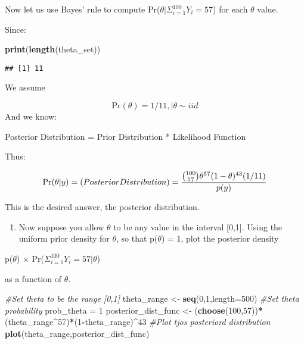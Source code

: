 \documentclass[]{article}
\newenvironment{Shaded}{\begin{snugshade}}{\end{snugshade}}
\newcommand{\KeywordTok}[1]{\textcolor[rgb]{0.13,0.29,0.53}{\textbf{#1}}}
\newcommand{\DataTypeTok}[1]{\textcolor[rgb]{0.13,0.29,0.53}{#1}}
\newcommand{\DecValTok}[1]{\textcolor[rgb]{0.00,0.00,0.81}{#1}}
\newcommand{\StringTok}[1]{\textcolor[rgb]{0.31,0.60,0.02}{#1}}
\newcommand{\CommentTok}[1]{\textcolor[rgb]{0.56,0.35,0.01}{\textit{#1}}}
\newcommand{\OperatorTok}[1]{\textcolor[rgb]{0.81,0.36,0.00}{\textbf{#1}}}
\newcommand{\NormalTok}[1]{#1}
\providecommand{\tightlist}{%
  \setlength{\itemsep}{0pt}\setlength{\parskip}{0pt}}
\begin{document}
Now let us use Bayes' rule to compute
Pr(\(\theta | \Sigma_{i=1}^{100} Y_i = 57\)) for each \(\theta\) value.

Since:

\begin{Shaded}
\begin{Highlighting}[]
\KeywordTok{print}\NormalTok{(}\KeywordTok{length}\NormalTok{(theta_set))}
\end{Highlighting}
\end{Shaded}

\begin{verbatim}
## [1] 11
\end{verbatim}

We assume

\[ \text{Pr}(\theta) = 1/11, | \theta \sim \text{}iid\] And we know:

Posterior Distribution = Prior Distribution * Likelihood Function

Thus:

\[ \text{Pr}(\theta|y) = \text(Posterior Distribution) = \frac{{100 \choose 57}\theta^{57} (1-\theta)^{43} (1/11)} {p(y)}\]

This is the desired answer, the posterior distribution.

\begin{enumerate}
\def\labelenumi{\alph{enumi})}
\setcounter{enumi}{3}
\tightlist
\item
  Now suppose you allow \(\theta\) to be any value in the interval
  {[}0,1{]}. Using the uniform prior density for \(\theta\), so that
  p(\(\theta\)) = 1, plot the posterior density
\end{enumerate}

p(\(\theta\)) × Pr(\(\Sigma_{i=1}^{100} Y_i = 57|\theta\))

as a function of \(\theta\).

\begin{Shaded}
\begin{Highlighting}[]
\CommentTok{#Set theta to be the range [0,1]}
\NormalTok{theta_range <-}\StringTok{ }\KeywordTok{seq}\NormalTok{(}\DecValTok{0}\NormalTok{,}\DecValTok{1}\NormalTok{,}\DataTypeTok{length=}\DecValTok{500}\NormalTok{)}
\CommentTok{#Set theta probability}
\NormalTok{prob_theta =}\StringTok{ }\DecValTok{1} 
\NormalTok{posterior_dist_func <-}\StringTok{ }\NormalTok{(}\KeywordTok{choose}\NormalTok{(}\DecValTok{100}\NormalTok{,}\DecValTok{57}\NormalTok{))}\OperatorTok{*}\NormalTok{(theta_range}\OperatorTok{^}\DecValTok{57}\NormalTok{)}\OperatorTok{*}\NormalTok{(}\DecValTok{1}\OperatorTok{-}\NormalTok{theta_range)}\OperatorTok{^}\DecValTok{43}
\CommentTok{#Plot tjos posteriord distribution}
\KeywordTok{plot}\NormalTok{(theta_range,posterior_dist_func)}
\end{Highlighting}
\end{Shaded}
\end{document}
